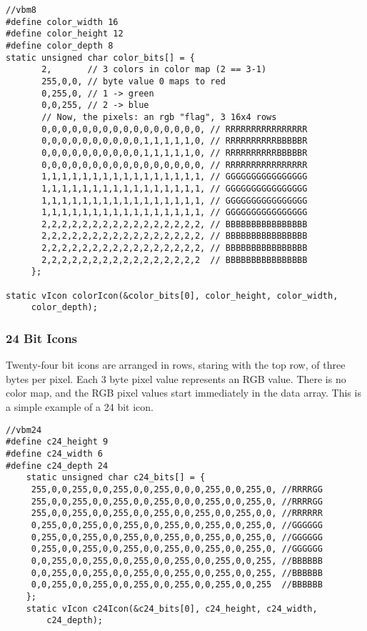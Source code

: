 \footnotesize
\begin{verbatim}
//vbm8
#define color_width 16
#define color_height 12
#define color_depth 8
static unsigned char color_bits[] = {
       2,       // 3 colors in color map (2 == 3-1)
       255,0,0, // byte value 0 maps to red
       0,255,0, // 1 -> green
       0,0,255, // 2 -> blue
       // Now, the pixels: an rgb "flag", 3 16x4 rows
       0,0,0,0,0,0,0,0,0,0,0,0,0,0,0,0, // RRRRRRRRRRRRRRRR
       0,0,0,0,0,0,0,0,0,0,1,1,1,1,1,0, // RRRRRRRRRRBBBBBR
       0,0,0,0,0,0,0,0,0,0,1,1,1,1,1,0, // RRRRRRRRRRBBBBBR
       0,0,0,0,0,0,0,0,0,0,0,0,0,0,0,0, // RRRRRRRRRRRRRRRR
       1,1,1,1,1,1,1,1,1,1,1,1,1,1,1,1, // GGGGGGGGGGGGGGGG
       1,1,1,1,1,1,1,1,1,1,1,1,1,1,1,1, // GGGGGGGGGGGGGGGG
       1,1,1,1,1,1,1,1,1,1,1,1,1,1,1,1, // GGGGGGGGGGGGGGGG
       1,1,1,1,1,1,1,1,1,1,1,1,1,1,1,1, // GGGGGGGGGGGGGGGG
       2,2,2,2,2,2,2,2,2,2,2,2,2,2,2,2, // BBBBBBBBBBBBBBBB
       2,2,2,2,2,2,2,2,2,2,2,2,2,2,2,2, // BBBBBBBBBBBBBBBB
       2,2,2,2,2,2,2,2,2,2,2,2,2,2,2,2, // BBBBBBBBBBBBBBBB
       2,2,2,2,2,2,2,2,2,2,2,2,2,2,2,2  // BBBBBBBBBBBBBBBB
     };

static vIcon colorIcon(&color_bits[0], color_height, color_width,
     color_depth);
\end{verbatim}
\normalfont\normalsize

\subsubsection*{24 Bit Icons}

Twenty-four bit icons are arranged in rows, staring with the top
row, of three bytes per pixel. Each 3 byte pixel value represents
an RGB value. There is no color map, and the RGB pixel values
start immediately in the  data array.
This is a simple example of a 24 bit icon.

\footnotesize
\begin{verbatim}
//vbm24
#define c24_height 9
#define c24_width 6
#define c24_depth 24
    static unsigned char c24_bits[] = {
     255,0,0,255,0,0,255,0,0,255,0,0,0,255,0,0,255,0, //RRRRGG
     255,0,0,255,0,0,255,0,0,255,0,0,0,255,0,0,255,0, //RRRRGG
     255,0,0,255,0,0,255,0,0,255,0,0,255,0,0,255,0,0, //RRRRRR
     0,255,0,0,255,0,0,255,0,0,255,0,0,255,0,0,255,0, //GGGGGG
     0,255,0,0,255,0,0,255,0,0,255,0,0,255,0,0,255,0, //GGGGGG
     0,255,0,0,255,0,0,255,0,0,255,0,0,255,0,0,255,0, //GGGGGG
     0,0,255,0,0,255,0,0,255,0,0,255,0,0,255,0,0,255, //BBBBBB
     0,0,255,0,0,255,0,0,255,0,0,255,0,0,255,0,0,255, //BBBBBB
     0,0,255,0,0,255,0,0,255,0,0,255,0,0,255,0,0,255  //BBBBBB
    };
    static vIcon c24Icon(&c24_bits[0], c24_height, c24_width,
        c24_depth);

\end{verbatim}
\normalfont\normalsize

